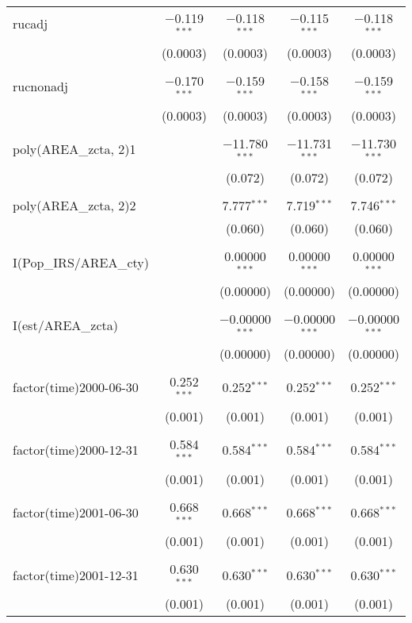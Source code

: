 \begin{table}[!htbp]
\begin{tabular}{@{\extracolsep{5pt}}lcccc}
 rucadj & $-$0.119$^{***}$ & $-$0.118$^{***}$ & $-$0.115$^{***}$ & $-$0.118$^{***}$ \\ 
  & (0.0003) & (0.0003) & (0.0003) & (0.0003) \\ 
  & & & & \\ 
 rucnonadj & $-$0.170$^{***}$ & $-$0.159$^{***}$ & $-$0.158$^{***}$ & $-$0.159$^{***}$ \\ 
  & (0.0003) & (0.0003) & (0.0003) & (0.0003) \\ 
  & & & & \\ 
 poly(AREA\_zcta, 2)1 &  & $-$11.780$^{***}$ & $-$11.731$^{***}$ & $-$11.730$^{***}$ \\ 
  &  & (0.072) & (0.072) & (0.072) \\ 
  & & & & \\ 
 poly(AREA\_zcta, 2)2 &  & 7.777$^{***}$ & 7.719$^{***}$ & 7.746$^{***}$ \\ 
  &  & (0.060) & (0.060) & (0.060) \\ 
  & & & & \\ 
 I(Pop\_IRS/AREA\_cty) &  & 0.00000$^{***}$ & 0.00000$^{***}$ & 0.00000$^{***}$ \\ 
  &  & (0.00000) & (0.00000) & (0.00000) \\ 
  & & & & \\ 
 I(est/AREA\_zcta) &  & $-$0.00000$^{***}$ & $-$0.00000$^{***}$ & $-$0.00000$^{***}$ \\ 
  &  & (0.00000) & (0.00000) & (0.00000) \\ 
  & & & & \\ 
 factor(time)2000-06-30 & 0.252$^{***}$ & 0.252$^{***}$ & 0.252$^{***}$ & 0.252$^{***}$ \\ 
  & (0.001) & (0.001) & (0.001) & (0.001) \\ 
  & & & & \\ 
 factor(time)2000-12-31 & 0.584$^{***}$ & 0.584$^{***}$ & 0.584$^{***}$ & 0.584$^{***}$ \\ 
  & (0.001) & (0.001) & (0.001) & (0.001) \\ 
  & & & & \\ 
 factor(time)2001-06-30 & 0.668$^{***}$ & 0.668$^{***}$ & 0.668$^{***}$ & 0.668$^{***}$ \\ 
  & (0.001) & (0.001) & (0.001) & (0.001) \\ 
  & & & & \\ 
 factor(time)2001-12-31 & 0.630$^{***}$ & 0.630$^{***}$ & 0.630$^{***}$ & 0.630$^{***}$ \\ 
  & (0.001) & (0.001) & (0.001) & (0.001) \\ 

\end{tabular}
\end{table}

